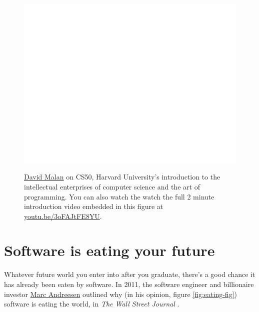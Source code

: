 \documentclass[
]{book}
\begin{document}
\begin{figure}

{\centering \href{https://www.youtube.com/embed/3oFAJtFE8YU}{\includegraphics[width=1\linewidth]{cdyf_files/figure-latex/malan-fig-1} }

}

\caption{\href{https://en.wikipedia.org/wiki/David_J._Malan}{David Malan} on CS50, Harvard University's introduction to the intellectual enterprises of computer science and the art of programming. You can also watch the watch the full 2 minute introduction video embedded in this figure at \href{https://youtu.be/3oFAJtFE8YU}{youtu.be/3oFAJtFE8YU}. \citep{youtube-malan, cs50}}\label{fig:malan-fig}
\end{figure}



\hypertarget{seating}{%
\section{Software is eating your future}\label{seating}}

Whatever future world you enter into after you graduate, there's a good chance it has already been eaten by software. In 2011, the software engineer and billionaire investor \href{https://en.wikipedia.org/wiki/Marc_Andreessen}{Marc Andreesen} outlined why (in his opinion, figure \ref{fig:eating-fig}) software is eating the world, in \emph{The Wall Street Journal} \citep{eatingtheworld}.
\end{document}
